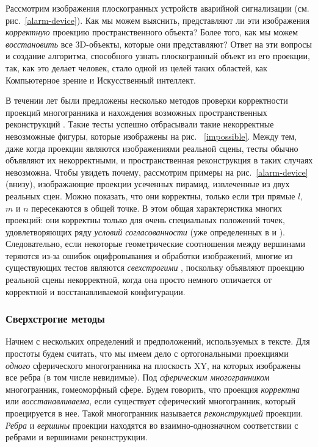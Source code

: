 \documentclass[a4paper,12pt, titlepage]{article}
\begin{document}
\begin{flushleft}
	Рассмотрим изображения плоскогранных устройств аварийной сигнализации (см. рис.~\ref{alarm-device}). 
Как мы можем выяснить,
представляют ли эти изображения \textit{корректную} проекцию пространственного объекта? Более того, как мы можем 
\textit{восстановить} все 3D-объекты, которые они представляют? Ответ на эти вопросы и создание алгоритма, способного
узнать плоскогранный объект из его проекции, так, как это делает человек, стало одной из целей таких областей, как 
Компьютерное зрение и Искусственный интеллект.
\end{flushleft}
\begin{flushleft}
	В течении лет были предложены несколько методов проверки корректности проекций многогранника и нахождения
возможных пространственных реконструкций \cite{Mackworth, Sugihara-MILD, Whiteley-2}. Такие тесты успешно отбрасывали
такие некорректные невозможные фигуры, которые изображены на рис. ~\ref{impossible}. Между тем, даже когда проекции являются
изображениями реальной сцены, тесты обычно объявляют их некорректными, и пространственная реконструкция в таких 
случаях невозможна. Чтобы увидеть почему, рассмотрим примеры на рис.~\ref{alarm-device} (внизу), изображающие проекции
усеченных пирамид, извлеченные из двух реальных сцен. Можно показать, что они корректны, только если три прямые 
$l$, $m$ и $n$ пересекаются в общей точке. В этом общая характеристика многих проекций: они корректны только для очень
специальных положений точек, удовлетворяющих ряду \textit{условий согласованности} (уже определенных в \cite{Whiteley-2}
и \cite{Ros-Thomas-1}). Следовательно, если некоторые геометрические соотношения между вершинами теряются из-за ошибок
оцифровывания и обработки изображений, многие из существующих тестов являются \textit{свехстрогими} \cite{Sugihara-MILD},
поскольку объявляют проекцию реальной сцены некорректной, когда она просто немного отличается от корректной и 
восстанавливаемой конфигурации.
\end{flushleft}

\subsubsection{Сверхстрогие методы}

\begin{flushleft}
	Начнем с нескольких определений и предположений, используемых в тексте. Для простоты будем считать, что 
мы имеем дело с ортогональными проекциями \textit{одного} сферического многогранника на плоскость XY, на которых
изображены все ребра (в том числе невидимые). Под \textit{сферическим многогранником} многогранник, гомеоморфный сфере.
Будем говорить, что проекция \textit{корректна} или \textit{восстанавливаема}, если существует сферический многогранник,
который проецируется в нее. Такой многогранник называется \textit{реконструкцией} проекции. \textit{Ребра} и 
\textit{вершины} проекции находятся во взаимно-однозначном соответствии с ребрами и вершинами реконструкции.
\end{flushleft}
\end{document}
